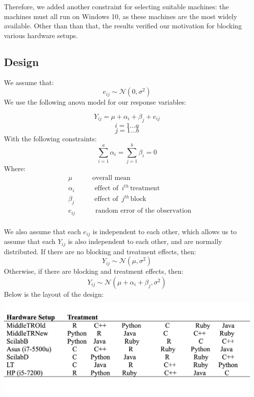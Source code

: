 \documentclass[12pt,halfline,a4paper,]{ouparticle}
\begin{document}
Therefore, we added another constraint for selecting suitable machines:
the machines must all run on Windows 10, as these machines are the most
widely available. Other than than that, the results verified our
motivation for blocking various hardware setups.

\subsection{Design}\label{design}

We assume that: \[
e_{ij} \sim \mathcal{N}(0, \sigma^2)
\] We use the following anova model for our response variables:

\[
Y_{ij} = \mu + \alpha_i + \beta_j+ e_{ij}
\] \[
i = 1 ...a
\] \[
j = 1 ...b
\] With the following constraints: \[
\sum_{i=1}^a \alpha_i = \sum_{j=1}^b \beta_i =0 
\] Where: \[
\begin{aligned}
&\mu\hspace{35pt}  \text{overall mean} \\
&\alpha_i\hspace{35pt} \text{effect of }\, i^{th}\, \text{treatment}\\
&\beta_j\hspace{35pt} \text{effect of }\, j^{th}\, \text{block}\\
&e_{ij}\hspace{35pt} \text{random error of the observation}\\
\end{aligned}
\]

We also assume that each \(e_{ij}\) is independent to each other, which
allows us to assume that each \(Y_{ij}\) is also independent to each
other, and are normally distributed. If there are no blocking and
treatment effects, then: \[
Y_{ij} \sim \mathcal{N}(\mu, \sigma^2)
\] Otherwise, if there are blocking and treatment effects, then: \[
Y_{ij} \sim \mathcal{N}(\mu + \alpha_i + \beta_j, \sigma^2)
\] Below is the layout of the design:\\
\includegraphics[width=\textwidth,height=2.08333in]{diagram.png}
\end{document}

